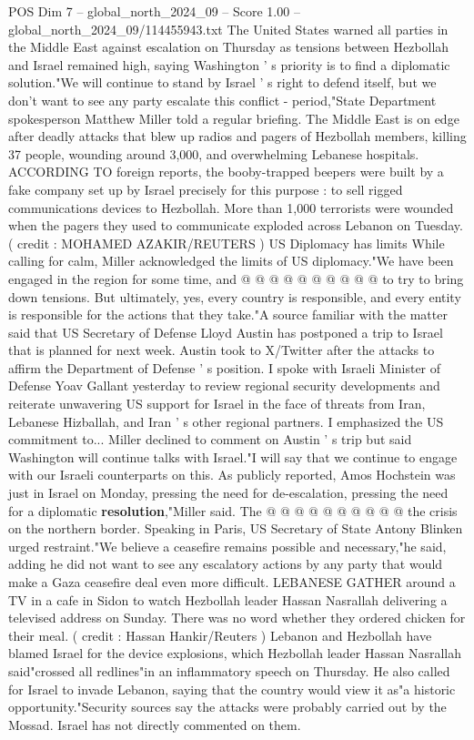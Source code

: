 \begin{textsample}{POS Dim 7 – global\_north\_2024\_09 – Score 1.00 – global\_north\_2024\_09/114455943.txt}  \label{ex:f7_pos_439}
The United States warned all parties in the Middle East against escalation on Thursday as tensions between Hezbollah and Israel remained high, saying Washington ' s priority is to find a diplomatic solution."We will continue to stand by Israel ' s right to defend itself, but we don't want to see any party escalate this conflict - period,"State Department spokesperson Matthew Miller told a regular briefing.
The Middle East is on edge after deadly attacks that blew up radios and pagers of Hezbollah members, killing 37 people, wounding around 3,000, and overwhelming Lebanese hospitals.
ACCORDING TO foreign reports, the booby-trapped beepers were built by a fake company set up by Israel precisely for this purpose : to sell rigged communications devices to Hezbollah.
More than 1,000 terrorists were wounded when the pagers they used to communicate exploded across Lebanon on Tuesday. ( credit : MOHAMED AZAKIR/REUTERS ) US Diplomacy has limits While calling for calm, Miller acknowledged the limits of US diplomacy."We have been engaged in the region for some time, and @ @ @ @ @ @ @ @ @ @ to try to bring down tensions.
But ultimately, yes, every country is responsible, and every entity is responsible for the actions that they take."A source familiar with the matter said that US Secretary of Defense Lloyd Austin has postponed a trip to Israel that is planned for next week.
Austin took to X/Twitter after the attacks to affirm the Department of Defense ' s position.
I spoke with Israeli Minister of Defense Yoav Gallant yesterday to review regional security developments and reiterate unwavering US support for Israel in the face of threats from Iran, Lebanese Hizballah, and Iran ' s other regional partners.
I emphasized the US commitment to...
Miller declined to comment on Austin ' s trip but said Washington will continue talks with Israel."I will say that we continue to engage with our Israeli counterparts on this.
As publicly reported, Amos Hochstein was just in Israel on Monday, pressing the need for de-escalation, pressing the need for a diplomatic \textbf{resolution},"Miller said.
The @ @ @ @ @ @ @ @ @ @ the crisis on the northern border.
Speaking in Paris, US Secretary of State Antony Blinken urged restraint."We believe a ceasefire remains possible and necessary,"he said, adding he did not want to see any escalatory actions by any party that would make a Gaza ceasefire deal even more difficult.
LEBANESE GATHER around a TV in a cafe in Sidon to watch Hezbollah leader Hassan Nasrallah delivering a televised address on Sunday.
There was no word whether they ordered chicken for their meal. ( credit : Hassan Hankir/Reuters ) Lebanon and Hezbollah have blamed Israel for the device explosions, which Hezbollah leader Hassan Nasrallah said"crossed all redlines"in an inflammatory speech on Thursday.
He also called for Israel to invade Lebanon, saying that the country would view it as"a historic opportunity."Security sources say the attacks were probably carried out by the Mossad.
Israel has not directly commented on them.

\end{textsample}
